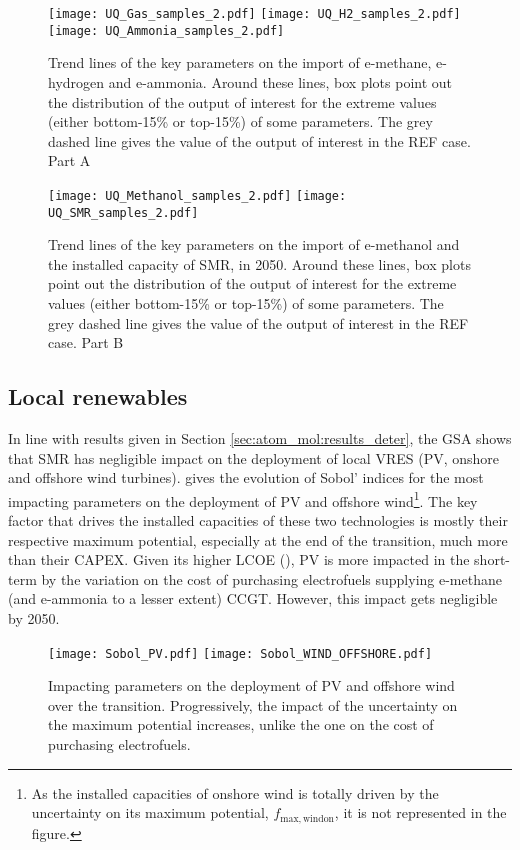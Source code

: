 \begin{figure}[htbp!]
\centering
\texttt{[image: UQ\_Gas\_samples\_2.pdf]}
\texttt{[image: UQ\_H2\_samples\_2.pdf]}
\texttt{[image: UQ\_Ammonia\_samples\_2.pdf]}

\caption{Trend lines of the key parameters on the import of e-methane, e-hydrogen and e-ammonia. Around these lines, box plots point out the distribution of the output of interest for the extreme values (either bottom-15\% or top-15\%) of some parameters. The grey dashed line gives the value of the output of interest in the REF case. Part A}
\label{fig:results_uq_samples_A}
\end{figure}

\begin{figure}[htbp!]
\centering
\texttt{[image: UQ\_Methanol\_samples\_2.pdf]}
\texttt{[image: UQ\_SMR\_samples\_2.pdf]}
\caption{Trend lines of the key parameters on the import of e-methanol and the installed capacity of \gls{SMR}, in 2050. Around these lines, box plots point out the distribution of the output of interest for the extreme values (either bottom-15\% or top-15\%) of some parameters. The grey dashed line gives the value of the output of interest in the REF case. Part B}
\label{fig:results_uq_samples_B}
\end{figure}

\subsection{Local renewables}
\label{subsec:atom_mol:results_uq_VRES}
In line with results given in Section \ref{sec:atom_mol:results_deter}, the \gls{GSA} shows that \gls{SMR} has negligible impact on the deployment of local \gls{VRES} (\ie \gls{PV}, onshore and offshore wind turbines).  gives the evolution of Sobol' indices for the most impacting parameters on the deployment of \gls{PV} and offshore wind\footnote{As the installed capacities of onshore wind is totally driven by the uncertainty on its maximum potential, $f_{\mathrm{max,windon}}$, it is not represented in the figure.}. The key factor that drives the installed capacities of these two technologies is mostly their respective maximum potential, especially at the end of the transition, much more than their CAPEX. Given its higher \gls{LCOE} (), \gls{PV} is more impacted in the short-term by the variation on the cost of purchasing electrofuels supplying e-methane (and e-ammonia to a lesser extent) \gls{CCGT}. However, this impact gets negligible by 2050.

\begin{figure}[htbp!]
\centering
\texttt{[image: Sobol\_PV.pdf]}
\texttt{[image: Sobol\_WIND\_OFFSHORE.pdf]}
\caption{Impacting parameters on the deployment of \gls{PV} and offshore wind over the transition. Progressively, the impact of the uncertainty on the maximum potential increases, unlike the one on the cost of purchasing electrofuels.}
\label{fig:results_uq_pdf_local_ren}
\end{figure}


